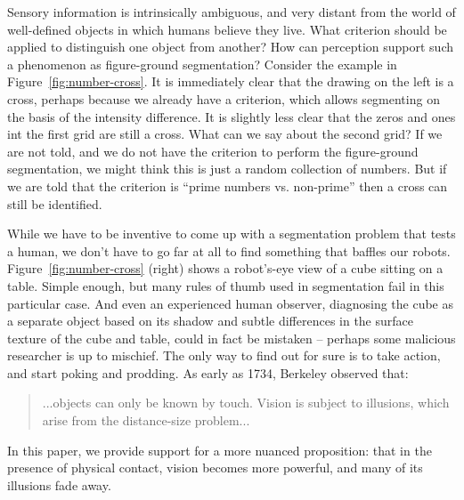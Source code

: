 \label{sect:introduction}

Sensory information is intrinsically ambiguous, and very distant from
the world of well-defined objects in which humans believe they live.  
What criterion should be applied to distinguish one object from
another?  How can perception support such a phenomenon as figure-ground
segmentation?  
Consider the example in Figure~\ref{fig:number-cross}.  It is
immediately clear that the drawing on the left is a cross, perhaps
because we already have a criterion, which allows segmenting on the
basis of the intensity difference. It is slightly less clear that the
zeros and ones int the first grid are still a cross. What can we say
about the second grid? If we are not told, and we do not have
the criterion to perform the figure-ground segmentation, we might
think this is just a random collection of numbers. But if we are told
that the criterion is ``prime numbers vs. non-prime'' then a cross can
still be identified.

While we have to be inventive to come up with a segmentation problem
that tests a human, we don't have to go far at all to find something
that baffles our robots.  Figure~\ref{fig:number-cross} (right) shows a
robot's-eye view of a cube sitting on a table.  Simple enough, but
many rules of thumb used in segmentation fail in this particular case.
And even an experienced human observer, diagnosing the cube as a
separate object based on its shadow and subtle differences in the
surface texture of the cube and table, could in fact be mistaken --
perhaps some malicious researcher is up to mischief.  The only way to
find out for sure is to take action, and start poking and prodding.
As early as 1734, Berkeley observed that:
%
\begin{quote}
...objects can only be known by
touch. Vision is subject to illusions, which arise from the
distance-size problem... \cite{berkeley72new}
\end{quote}
%
In this paper, we provide support for a more nuanced proposition: that
in the presence of physical contact, vision becomes more powerful, and many of
its illusions fade away.


